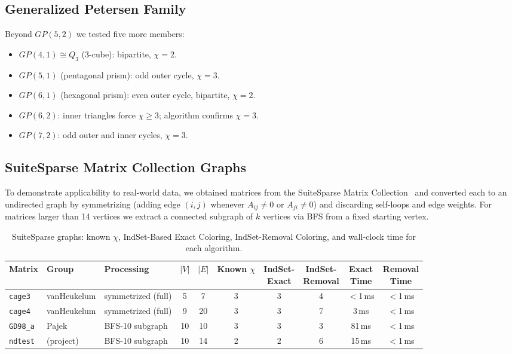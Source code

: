 \documentclass[11pt]{article}
\begin{document}
\subsection{Generalized Petersen Family}

Beyond $GP(5,2)$ we tested five more members:

\begin{itemize}
  \item $GP(4,1) \cong Q_3$ (3-cube): bipartite, $\chi = 2$.
  \item $GP(5,1)$ (pentagonal prism): odd outer cycle, $\chi = 3$.
  \item $GP(6,1)$ (hexagonal prism): even outer cycle, bipartite, $\chi = 2$.
  \item $GP(6,2)$: inner triangles force $\chi \geq 3$; algorithm confirms $\chi = 3$.
  \item $GP(7,2)$: odd outer and inner cycles, $\chi = 3$.
\end{itemize}

\subsection{SuiteSparse Matrix Collection Graphs}\label{sec:suitesparse}

To demonstrate applicability to real-world data, we obtained matrices from
the SuiteSparse Matrix Collection~\cite{SuiteSparse} and converted each to
an undirected graph by symmetrizing (adding edge $(i,j)$ whenever $A_{ij}
\neq 0$ or $A_{ji} \neq 0$) and discarding self-loops and edge weights.
For matrices larger than 14 vertices we extract a connected subgraph of $k$
vertices via BFS from a fixed starting vertex.

\begin{table}[h]
\centering
\caption{SuiteSparse graphs: known $\chi$, IndSet-Based Exact Coloring,
  IndSet-Removal Coloring, and wall-clock time for each algorithm.}
\label{tab:suitesparse}
{\footnotesize
\begin{tabular}{lllccc ccc c}
\toprule
Matrix & Group & Processing & $|V|$ & $|E|$ & \makecell{Known\\$\chi$} & \makecell{IndSet-\\Exact} & \makecell{IndSet-\\Removal} & \makecell{Exact\\Time} & \makecell{Removal\\Time} \\
\midrule
\texttt{cage3}   & vanHeukelum & symmetrized (full) & 5  &  7 & 3 & 3 & 4 & $<$1\,ms & $<$1\,ms \\
\texttt{cage4}   & vanHeukelum & symmetrized (full) & 9  & 20 & 3 & 3 & 7 &    3\,ms & $<$1\,ms \\
\texttt{GD98\_a} & Pajek       & BFS-10 subgraph    & 10 & 10 & 3 & 3 & 3 &   81\,ms & $<$1\,ms \\
\texttt{ndtest}  & (project)   & BFS-10 subgraph    & 10 & 14 & 2 & 2 & 6 &   15\,ms & $<$1\,ms \\
\bottomrule
\end{tabular}}
\end{table}
\end{document}
